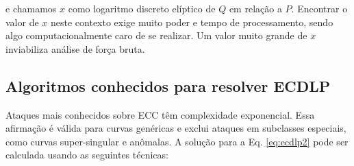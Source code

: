 e chamamos \(x\) como logaritmo discreto elíptico de \(Q\) em relação a \(P\). \cite{Hoffstein:2008} Encontrar o valor de \(x\) neste contexto exige muito poder e tempo de processamento, sendo algo computacionalmente caro de se realizar. Um valor muito grande de \(x\) inviabiliza análise de força bruta.

%
%
\subsection{Algoritmos conhecidos para resolver ECDLP}
\label{sec:algs}
Ataques mais conhecidos sobre ECC têm complexidade exponencial. Essa afirmação é válida para curvas genéricas e exclui ataques em subclasses especiais, como curvas super-singular e anômalas. A solução para a Eq. \ref{eq:ecdlp2} pode ser calculada usando as seguintes técnicas: \cite{Pelzl:2006}

